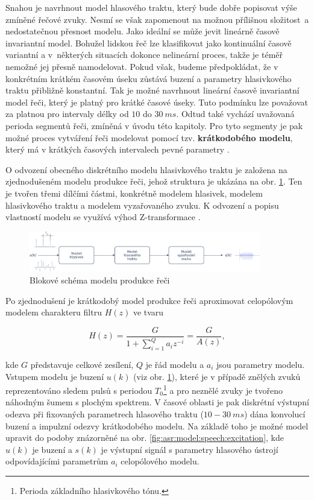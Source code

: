Snahou je navrhnout model hlasového traktu, který bude dobře popisovat výše zmíněné řečové zvuky. Nesmí se však zapomenout na možnou přílišnou složitost~a nedostatečnou přesnost modelu. Jako ideální se může jevit lineárně časově invariantní model. Bohužel lidskou řeč lze klasifikovat jako kontinuální časově variantní a v~některých situacích dokonce nelineární proces, takže je téměř nemožné jej přesně namodelovat. Pokud však, budeme předpokládat, že v konkrétním krátkém časovém úseku zůstává buzení a parametry hlasivkového traktu přibližně konstantní. Tak je možné navrhnout lineární časově invariantní model řeči, který je platný pro krátké časové úseky. Tuto podmínku lze považovat za platnou pro intervaly délky od $10$ do $30\ ms$. Odtud také vychází uvažovaná perioda segmentů řeči, zmíněná v úvodu této kapitoly. Pro tyto segmenty je pak možné proces vytváření řeči modelovat pomocí tzv. \textbf{krátkodobého modelu}, který má v krátkých časových intervalech pevné parametry \cite{Holmes2001}.

O odvození obecného diskrétního modelu hlasivkového traktu je založena na zjednodušeném modelu produkce řeči, jehož struktura je ukázána na obr. \ref{fig:asr:model:speech}. Ten je tvořen třemi dílčími částmi, konkrétně modelem hlasivek, modelem hlasivkového traktu a modelem vyzařovaného zvuku. K odvození a popisu vlastností modelu se využívá výhod Z-transformace \cite{Psutka2006}.

\begin{figure}[hbpt]
  \centering
  \includegraphics[width=0.9\textwidth]{./ch4-asr/img/speech_model.pdf}
  \caption{Blokové schéma modelu produkce řeči}
  \label{fig:asr:model:speech}
\end{figure}


\noindent Po zjednodušení je krátkodobý model produkce řeči aproximovat celopólovým modelem charakteru filtru $H(z)$ ve tvaru

\begin{equation}
  H(z) = \frac{G}{1 + \sum_{i = 1}^{Q} a_{i} z^{-i}} = \frac{G}{A(z)},
  \label{eq:asr:lpc:generic}
\end{equation}

\noindent kde $G$ představuje celkové zesílení, $Q$ je řád modelu a $a_i$ jsou parametry modelu. Vstupem modelu je buzení $u(k)$ (viz obr. \ref{fig:asr:model:speech}), které je v případě znělých zvuků reprezentováno sledem pulsů s periodou $T_0$\footnote{Perioda základního hlasivkového tónu.} a pro neznělé zvuky je tvořeno náhodným šumem s plochým spektrem. V časové oblasti je pak diskrétní výstupní odezva při fixovaných parametrech hlasového traktu ($10 - 30\ ms$) dána konvolucí buzení a impulzní odezvy krátkodobého modelu. Na základě toho je možné model upravit do podoby znázorněné na obr. \ref{fig:asr:model:speech:excitation}, kde $u(k)$ je buzení a $s(k)$ je výstupní signál s parametry hlasového ústrojí odpovídajícími parametrům $a_i$ celopólového modelu.

